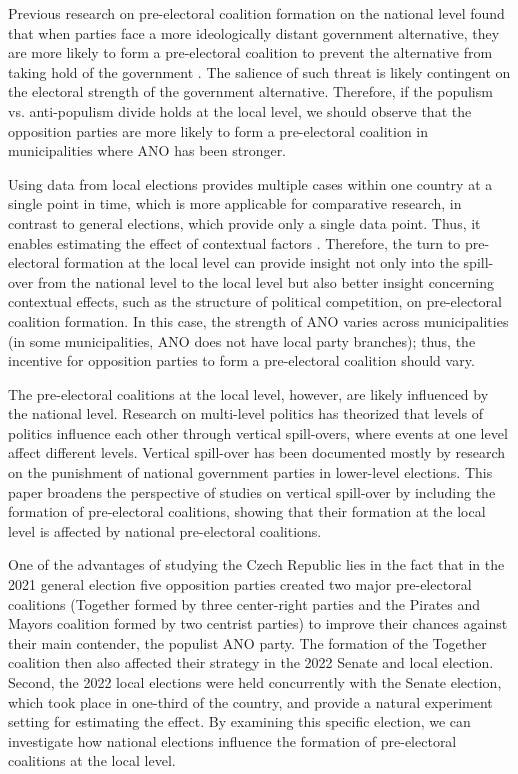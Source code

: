 \documentclass[]{interact}
\theoremstyle{plain}%
\theoremstyle{definition}
\theoremstyle{remark}
\begin{document}
Previous research on pre-electoral coalition formation on the national level found that when parties face a more ideologically distant government alternative, they are more likely to form a pre-electoral coalition to prevent the alternative from taking hold of the government \citep{golder2006}. The salience of such threat is likely contingent on the electoral strength of the government alternative. Therefore, if the populism vs. anti-populism divide holds at the local level, we should observe that the opposition parties are more likely to form a pre-electoral coalition in municipalities where ANO has been stronger. 

Using data from local elections provides multiple cases within one country at a single point in time, which is more applicable for comparative research, in contrast to general elections, which provide only a single data point. Thus, it enables estimating the effect of contextual factors \citep[77]{back2008}. Therefore, the turn to pre-electoral formation at the local level can provide insight not only into the spill-over from the national level to the local level but also better insight concerning contextual effects, such as the structure of political competition, on pre-electoral coalition formation. In this case, the strength of ANO varies across municipalities (in some municipalities, ANO does not have local party branches); thus, the incentive for opposition parties to form a pre-electoral coalition should vary.

The pre-electoral coalitions at the local level, however, are likely influenced by the national level. Research on multi-level politics has theorized that levels of politics influence each other through vertical spill-overs, where events at one level affect different levels. Vertical spill-over has been documented mostly by research on the punishment of national government parties in lower-level elections. This paper broadens the perspective of studies on vertical spill-over by including the formation of pre-electoral coalitions, showing that their formation at the local level is affected by national pre-electoral coalitions.

One of the advantages of studying the Czech Republic lies in the fact that in the 2021 general election five opposition parties created two major pre-electoral coalitions (Together formed by three center-right parties and the Pirates and Mayors coalition formed by two centrist parties) to improve their chances against their main contender, the populist ANO party. The formation of the Together coalition then also affected their strategy in the 2022 Senate and local election. Second, the 2022 local elections were held concurrently with the Senate election, which took place in one-third of the country, and provide a natural experiment setting for estimating the effect. By examining this specific election, we can investigate how national elections influence the formation of
pre-electoral coalitions at the local level.
\end{document}
